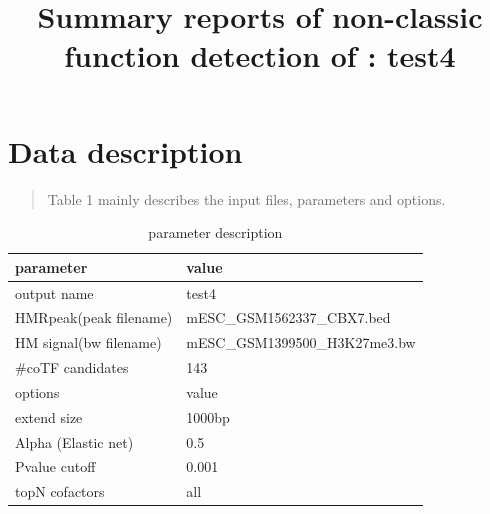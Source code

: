 \documentclass[11pt,a4paper]{article}
\begin{document}
\title{Summary reports of non-classic function detection of : test4}

\vspace{-1cm}
\maketitle
\tableofcontents
\newpage
\newpage
\section{Data description}
\begin{quotation}
Table 1 mainly describes the input files, parameters and options.
\end{quotation}
\begin{table}[h]
\caption{parameter description}\label{bstable}
\begin{tabularx}{\textwidth}{ |X|l| }

      
\hline
parameter & value  \\
\hline
output name & test4 \\
\hline
HMRpeak(peak filename) & mESC\_GSM1562337\_CBX7.bed \\
\hline
HM signal(bw filename) & mESC\_GSM1399500\_H3K27me3.bw  \\
\hline
\#coTF candidates & 143 \\
\hline
options & value \\
\hline
extend size & 1000bp \\
\hline
Alpha (Elastic net) & 0.5 \\
\hline
Pvalue cutoff & 0.001 \\
\hline
topN cofactors & all \\
\hline

\end{tabularx}
\end{table}

\newpage
\newpage
\end{document}
